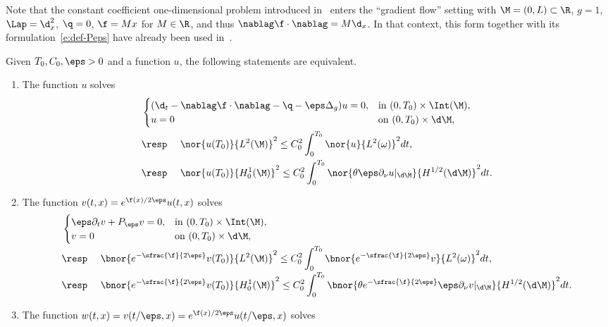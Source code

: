 Note that the constant coefficient one-dimensional problem introduced in~\cite{CG:05} enters the ``gradient flow'' setting with $\M =(0,L)\subset \R$, $g=1$, $\Lap=\d_x^2$, $\q=0$, $\f = M x$ for $M\in \R$, and thus $\nablag \f \cdot \nablag = M \d_x$. In that context, this form together with its formulation~\eqref{e:def-Peps} have already been used in~\cite{CG:05,Gla:10,Lissy:14,Lissy:15}.
\begin{lemma}
\label{lemequiveunif}
Given $T_0, C_0, \eps >0$ and a function $u$, the following statements are equivalent.
\begin{enumerate}
\item The function $u$ solves
\begin{align}
\label{e:heat-transp-eps}
&\begin{cases}
(\d_t - \nablag \f\cdot \nablag -\q - \eps \Delta_g ) u = 0, & \text{in } (0,T_0)\times\Int(\M), \\
u = 0 & \text{on } (0,T_0)\times \d\M,
\end{cases}
\\
\label{e:obs-heat-transp-eps}
&\text{\resp }\quad \nor{u(T_0)}{L^2(\M)}^2 \leq C_0^2\int_0^{T_0}\nor{u}{L^2(\omega)}^2 dt, \\
\label{e:obs-heat-transp-epsboundary}
&\text{\resp }\quad \nor{u(T_0)}{H^1_0(\M)}^2 \leq C_0^2\int_0^{T_0}\nor{\theta \eps \partial_{\nu}u|_{\d\M}}{H^{1/2}(\d\M)}^2 dt.
\end{align}
\item The function $v(t,x)= e^{\f(x)/2\eps}u(t,x)$ solves
\begin{align}
\label{e:heat-transp-eps-Witt}
&\begin{cases}
\eps \partial_t v + P_\eps v =0, & \text{in } (0,T_0)\times\Int(\M), \\
v = 0 & \text{on } (0,T_0)\times \d\M,
\end{cases}
\\[-2pt]
\label{e:obs-heat-transp-eps-Witt}
&\text{\resp }\quad \bnor{e^{-\sfrac{\f}{2\eps}}v(T_0)}{L^2(\M)}^2 \leq C_0^2\int_0^{T_0}\bnor{e^{-\sfrac{\f}{2\eps}}v }{L^2(\omega)}^2 dt, \\[-2pt]
\label{e:obs-heat-transp-eps-Wittboundary}
&\text{\resp }\quad \bnor{e^{-\sfrac{\f}{2\eps}}v(T_0)}{H^1_0(\M)}^2 \leq C_0^2\int_0^{T_0}\bnor{\theta e^{-\sfrac{\f}{2\eps}} \eps \partial_{\nu}v|_{\d\M} }{H^{1/2}(\d\M)}^2 dt.
\end{align}
\item The function $w(t,x) = v(t/\eps, x)= e^{\f(x)/2\eps}u(t/\eps,x)$ solves
\begin{align}

\end{align}
\end{enumerate}
\end{lemma}
